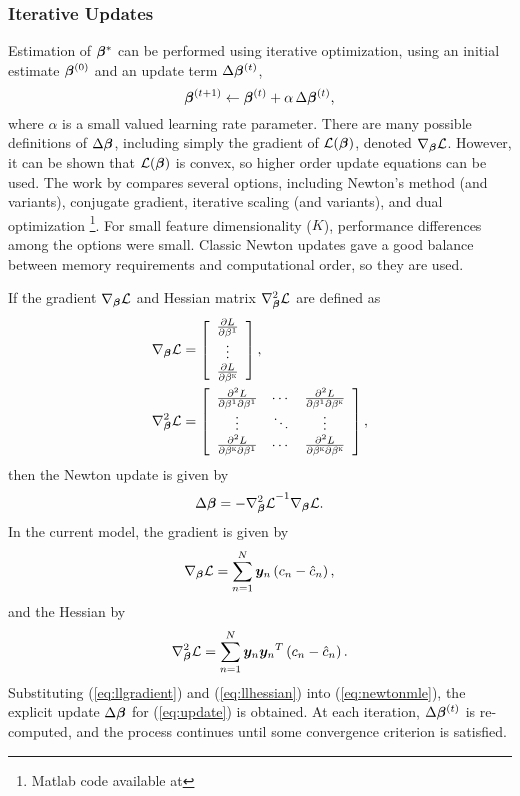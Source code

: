 \subsubsection{Iterative Updates}
Estimation of $\bm{\beta}^*$ can be performed using iterative optimization, using an initial estimate $\bm{\beta}^{(0)}$ and an update term $\Delta\bm{\beta}^{(t)}$,
\begin{equation}
\bm{\beta}^{(t+1)} \leftarrow \bm{\beta}^{(t)} + \alpha\thinspace\Delta\bm{\beta}^{(t)},
\label{eq:update}
\end{equation}
where $\alpha$ is a small valued learning rate parameter.
There are many possible definitions of $\Delta\bm{\beta}$, including simply the gradient of $\mathcal{L}(\bm{\beta})$, denoted $\nabla_{\bm{\beta}}\mathcal{L}$.
However, it can be shown that $\mathcal{L}(\bm{\beta})$ is convex, so higher order update equations can be used.
The work by \citeauthor{Minka2003} \cite{Minka2003} compares several options, including Newton's method (and variants), conjugate gradient, iterative scaling (and variants), and dual optimization%
\footnote{Matlab code available at }.
For small feature dimensionality ($K$), performance differences among the options were small.
Classic Newton updates gave a good balance between memory requirements and computational order, so they are used.
\par
If the gradient $\nabla_{\bm{\beta}}\mathcal{L}$ and Hessian matrix $\nabla^2_{\bm{\beta}}\mathcal{L}$ are defined as
\begin{align}
\nabla_{\bm{\beta}}\mathcal{L} &= \left[\begin{array}{c}
\frac{\partial L}{\partial\beta^1}\\\vdots\\\frac{\partial L}{\partial\beta^{\textsc{k}}}
\end{array}\right],\label{eq:llgradient0}\\
\nabla^2_{\bm{\beta}}\mathcal{L} &= \left[\begin{array}{ccc}
\frac{\partial^2 L}{\partial\beta^1\partial\beta^1}&\cdots&\frac{\partial^2 L}{\partial\beta^1\partial\beta^{\textsc{k}}}\\
\vdots&\ddots&\vdots\\
\frac{\partial^2 L}{\partial\beta^{\textsc{k}}\partial\beta^1}&\cdots&\frac{\partial^2 L}{\partial\beta^{\textsc{k}}\partial\beta^{\textsc{k}}}
\end{array}\right]\label{eq:llhessian0},
\end{align}
then the Newton update is given by
\begin{equation}
\Delta\bm{\beta} = -{\nabla^2_{\bm{\beta}}\mathcal{L}}^{-1}\nabla_{\bm{\beta}}\mathcal{L}.
\label{eq:newtonmle}
\end{equation}
In the current model, the gradient is given by 
\begin{equation}
\nabla_{\bm{\beta}}\mathcal{L} = \sum_{n=1}^{N} \bm{y}_n\left(c_n - \hat{c}_n\right),
\label{eq:llgradient}
\end{equation}
and the Hessian by
\begin{equation}
\nabla^2_{\bm{\beta}}\mathcal{L} = \sum_{n=1}^{N} \bm{y}_n{\bm{y}_n}^T \left(c_n - \hat{c}_n\right).
\label{eq:llhessian}
\end{equation}
Substituting (\ref{eq:llgradient}) and (\ref{eq:llhessian}) into (\ref{eq:newtonmle}), the explicit update $\Delta\bm{\beta}$ for (\ref{eq:update}) is obtained.
At each iteration, $\Delta\bm{\beta}^{(t)}$ is re-computed, and the process continues until some convergence criterion is satisfied.
